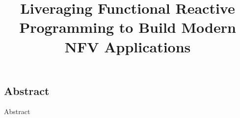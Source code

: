 \title{\Large \bf Liveraging Functional Reactive Programming to Build Modern NFV Applications}

\maketitle

\subsection*{Abstract}
Abstract







{\footnotesize 
}









